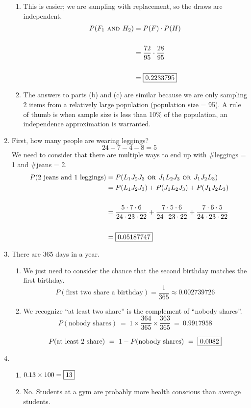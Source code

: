 \documentclass[12pt,letterpaper]{article}
\begin{document}
\begin{enumerate}
\begin{enumerate}
\item This is easier; we are sampling with replacement, so the draws are independent.
\begin{align*}
P(F_1 \textsc{~and~} H_2) &= P(F) \cdot P(H) \\\\
&= \frac{72}{95} \cdot \frac{28}{95} \\\\
&= \fbox{0.2233795}
\end{align*}

\item The answers to parts (b) and (c) are similar because we are only sampling 2 items from a relatively large population (population size = 95). A rule of thumb is when sample size is less than 10\% of the population, an independence approximation is warranted.
\end{enumerate}

\item First, how many people are wearing leggings?
$$24-7-4-8 =  5$$
We need to consider that there are multiple ways to end up with \#leggings = 1 and \#jeans = 2.
\begin{align*}
P(\text{2 jeans and 1 leggings}) &= P(L_1J_2J_3 \textsc{~or~} J_1L_2J_3 \textsc{~or~} J_1J_2L_3) \\
&= P(L_1J_2J_3) + P(J_1L_2J_3) + P(J_1J_2L_3) \\\\
&= \frac{5\cdot 7 \cdot 6}{24\cdot 23\cdot 22} + \frac{7\cdot 5 \cdot 6}{24\cdot 23\cdot 22} + \frac{7\cdot 6 \cdot 5}{24\cdot 23\cdot 22} \\ \\
&= \fbox{0.05187747}
\end{align*}

\item There are 365 days in a year.
\begin{enumerate}
\item We just need to consider the chance that the second birthday matches the first birthday.
$$P(\text{first two share a birthday}) = \frac{1}{365} \approx  0.002739726$$
\item We recognize ``at least two share'' is the complement of ``nobody shares''.
$$P(\text{nobody shares}) ~=~ 1\times \frac{364}{365} \times \frac{363}{365} ~=~ 0.9917958 $$

$$P(\text{at least 2 share}) ~=~ 1-P(\text{nobody shares}) ~=~ \fbox{0.0082} $$
\end{enumerate}

\item \begin{enumerate}
\item $0.13 \times 100 = \fbox{13}$
\item No. Students at a gym are probably more health conscious than average students.
\end{enumerate}


\end{enumerate}
\end{document}
